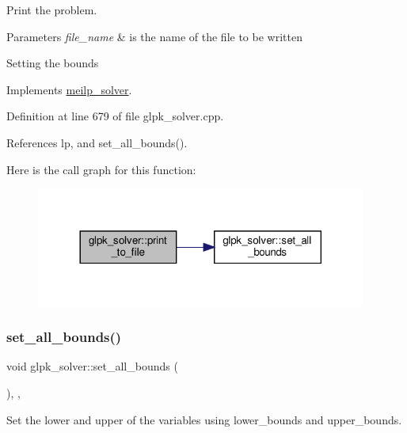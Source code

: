 Print the problem. 


\begin{DoxyParams}{Parameters}
{\em file\+\_\+name} & is the name of the file to be written \\
\hline
\end{DoxyParams}
Setting the bounds 

Implements \hyperlink{classmeilp__solver_af9f40eca7fda0fae7436fe7a24c589b7}{meilp\+\_\+solver}.



Definition at line 679 of file glpk\+\_\+solver.\+cpp.



References lp, and set\+\_\+all\+\_\+bounds().

Here is the call graph for this function\+:
\nopagebreak
\begin{figure}[H]
\begin{center}
\leavevmode
\includegraphics[width=308pt]{db/d0a/classglpk__solver_aaee0e321445ea081d26952772e4e2eef_cgraph}
\end{center}
\end{figure}
\mbox{\label{classglpk__solver_a452c9cc528757df64c8afd83274e5ae5}} 
\subsubsection{\texorpdfstring{set\+\_\+all\+\_\+bounds()}{set\_all\_bounds()}}
{\footnotesize\ttfamily void glpk\+\_\+solver\+::set\+\_\+all\+\_\+bounds (\begin{DoxyParamCaption}{ }\end{DoxyParamCaption})\hspace{0.3cm}{\ttfamily [override]}, {\ttfamily [private]}, {\ttfamily [virtual]}}



Set the lower and upper of the variables using lower\+\_\+bounds and upper\+\_\+bounds. 



